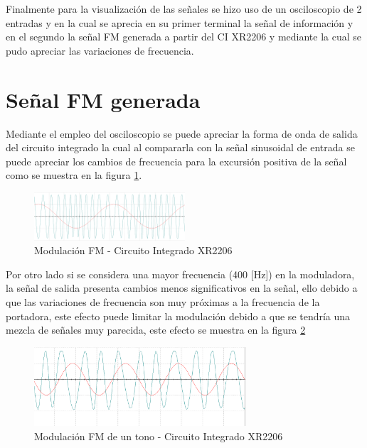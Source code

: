 \documentclass[conference]{IEEEtran}
\begin{document}
	Finalmente para la visualización de las señales se hizo uso de un osciloscopio de 2 entradas y en la cual se aprecia en su primer terminal la señal de información y en el segundo la señal FM generada a partir del CI XR2206 y mediante la cual se pudo apreciar las variaciones de frecuencia.
	
	\section{Señal FM generada}
	
	Mediante el empleo del osciloscopio se puede apreciar la forma de onda de salida del circuito integrado la cual al compararla con la señal sinusoidal de entrada se puede apreciar los cambios de frecuencia para la excursión positiva de la señal como se muestra en la figura \ref{fig:mod-fm-circuito}.
	
	\begin{figure}[h]
		\centering
		\includegraphics[width=0.5\textwidth]{media/mod-fm-circuito}
		\caption{Modulación FM - Circuito Integrado XR2206}
		\label{fig:mod-fm-circuito}
	\end{figure}
	
	Por otro lado si se considera una mayor frecuencia (400 [Hz]) en la moduladora, la señal de salida presenta cambios menos significativos en la señal, ello debido a que las variaciones de frecuencia son muy próximas a la frecuencia de la portadora, este efecto puede limitar la modulación debido a que se tendría una mezcla de señales muy parecida, este efecto se muestra en la figura \ref{fig:mod-fm-circuito-400}
	
	\begin{figure}[h]
		\centering
		\includegraphics[width=0.7\textwidth]{media/mod-fm-circuito-400}
		\caption{Modulación FM de un tono - Circuito Integrado XR2206}
		\label{fig:mod-fm-circuito-400}
	\end{figure}
	
\end{document}
